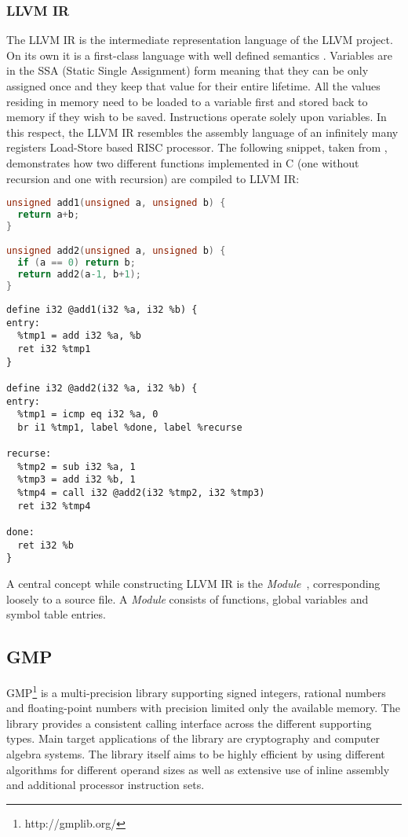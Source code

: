 \subsubsection{LLVM IR}

The LLVM IR is the intermediate representation language of the LLVM
project. On its own it is a first-class language with well defined
semantics \cite{llvm_general, llvm_master_thesis}. Variables are in
the SSA (Static Single Assignment) form meaning that they can be only
assigned once and they keep that value for their entire lifetime. All
the values residing in memory need to be loaded to a variable first
and stored back to memory if they wish to be saved. Instructions
operate solely upon variables. In this respect, the LLVM IR resembles
the assembly language of an infinitely many registers Load-Store based
RISC processor. The following snippet, taken from \cite{llvm_general},
demonstrates how two different functions implemented in C (one without
recursion and one with recursion) are compiled to LLVM IR:

\begin{lstlisting}[language=C]
unsigned add1(unsigned a, unsigned b) {
  return a+b;
}

unsigned add2(unsigned a, unsigned b) {
  if (a == 0) return b;
  return add2(a-1, b+1);
}
\end{lstlisting}

\begin{lstlisting}
define i32 @add1(i32 %a, i32 %b) {
entry:
  %tmp1 = add i32 %a, %b
  ret i32 %tmp1
}

define i32 @add2(i32 %a, i32 %b) {
entry:
  %tmp1 = icmp eq i32 %a, 0
  br i1 %tmp1, label %done, label %recurse

recurse:
  %tmp2 = sub i32 %a, 1
  %tmp3 = add i32 %b, 1
  %tmp4 = call i32 @add2(i32 %tmp2, i32 %tmp3)
  ret i32 %tmp4

done:
  ret i32 %b
}
\end{lstlisting}

A central concept while constructing LLVM IR is the
\emph{Module}~\cite{llvm_ir}, corresponding loosely to a source
file. A \emph{Module} consists of functions, global variables and
symbol table entries.

\subsection{GMP}
\label{subsec:gmp}

GMP\footnote{http://gmplib.org/} is a multi-precision library
supporting signed integers, rational numbers and floating-point
numbers with precision limited only the available memory. The library
provides a consistent calling interface across the different
supporting types. Main target applications of the library are
cryptography and computer algebra systems. The library itself aims to
be highly efficient by using different algorithms for different
operand sizes as well as extensive use of inline assembly and
additional processor instruction sets.

